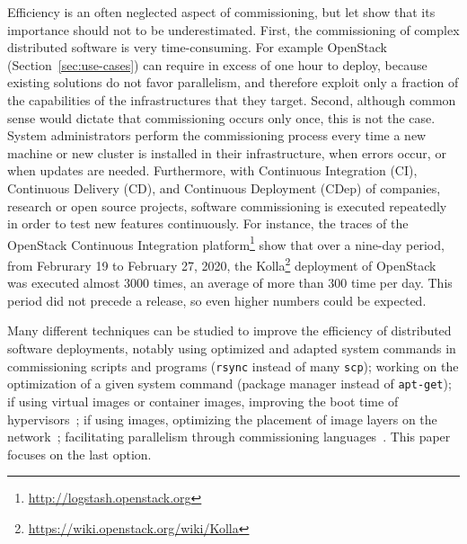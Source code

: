 Efficiency is an often neglected aspect of commissioning, but let show
that its importance should not to be underestimated. First, the
commissioning of complex distributed software is very
time-consuming. For example OpenStack (Section~\ref{sec:use-cases})
can require in excess of one hour to deploy, because existing
solutions do not favor parallelism, and therefore exploit only a
fraction of the capabilities of the infrastructures that they
target. Second, although common sense would dictate that commissioning
occurs only once, this is not the case. System administrators perform
the commissioning process every time a new machine or new cluster is
installed in their infrastructure, when errors occur, or when updates
are needed.
%
Furthermore, with Continuous Integration (CI), Continuous Delivery
(CD), and Continuous Deployment (CDep) of companies, research or open
source projects, software commissioning is executed repeatedly in
order to test new features continuously. For instance, the traces of
the OpenStack Continuous Integration
platform\footnote{\url{http://logstash.openstack.org}} show that over
a nine-day period, from Februrary 19 to February 27, 2020, the
Kolla\footnote{\url{https://wiki.openstack.org/wiki/Kolla}} deployment
of OpenStack was executed almost 3000 times, an average of more than
300 time per day. This period did not precede a release, so even
higher numbers could be expected.


Many different techniques can be studied to improve the
efficiency of distributed software deployments, notably using
optimized and adapted system commands in commissioning scripts and
programs (\eg \texttt{rsync} instead of many \texttt{scp}); working on
the optimization of a given system command (\eg \nix package manager
instead of \texttt{apt-get}); if using virtual images or container
images, improving the boot time of
hypervisors~\cite{nguyen:hal-02172288}; if using \docker images,
optimizing the placement of image layers on the
network~\cite{darrous:hal-01745405}; facilitating parallelism through
commissioning languages~\cite{dicosmo:hal-01233489}. This paper
focuses on the last option.

